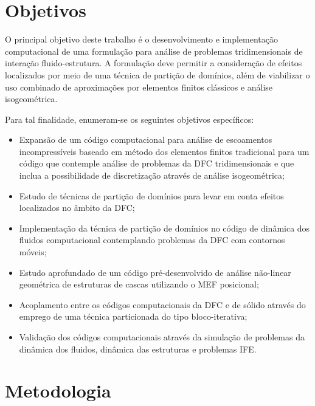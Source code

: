 \documentclass[tese_patricia.tex]{subfiles}
\begin{document}
\section[Objetivos]{Objetivos}

O principal objetivo deste trabalho é o desenvolvimento e implementação computacional de uma formulação para análise de problemas tridimensionais de interação fluido-estrutura. A formulação deve permitir a consideração de efeitos localizados por meio de uma técnica de partição de domínios, além de viabilizar o uso combinado de aproximações por elementos finitos clássicos e análise isogeométrica.

Para tal finalidade, enumeram-se os seguintes objetivos específicos:

\begin{itemize}
	\item Expansão de um código computacional para análise de escoamentos incompressíveis baseado em método dos elementos finitos tradicional para um código que contemple análise de problemas da DFC tridimensionais e que inclua a possibilidade de discretização através de análise isogeométrica;
	
	\item Estudo de técnicas de partição de domínios para levar em conta efeitos localizados no âmbito da DFC;
	
	\item Implementação da técnica de partição de domínios no código de dinâmica dos fluidos computacional contemplando problemas da DFC com contornos móveis;
	
	\item Estudo aprofundado de um código pré-desenvolvido de análise não-linear geométrica de estruturas de cascas utilizando o MEF posicional;
	
	\item Acoplamento entre os códigos computacionais da DFC e de sólido através do emprego de uma técnica particionada do tipo bloco-iterativa;
	
	\item  Validação dos códigos computacionais através da simulação de problemas da dinâmica dos fluidos, dinâmica das estruturas e problemas IFE.
	
\end{itemize}

\section[Metodologia]{Metodologia} 
\end{document}
